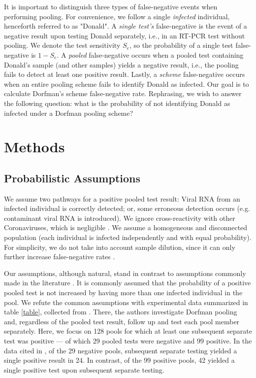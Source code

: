\documentclass{article}
\newcommand{\Se}{S_e}
\begin{document}
It is important to distinguish three types of false-negative events when performing pooling. For convenience, we follow a single \emph{infected} individual, henceforth referred to as "Donald". A \emph{single test's} false-negative is the event of a negative result upon testing Donald separately, i.e., in an RT-PCR test without pooling. We denote the test sensitivity $\Se$, so the probability of a single test false-negative is $1-\Se$. A \emph{pooled} false-negative occurs when a pooled test containing Donald's sample (and other samples) yields a negative result, i.e., the pooling fails to detect at least one positive result. Lastly, a \emph{scheme} false-negative occurs when an entire pooling scheme fails to identify Donald as infected. Our goal is to calculate Dorfman's scheme false-negative rate. Rephrasing, we wish to answer the following question: what is the probability of not identifying Donald as infected under a Dorfman pooling scheme? 




\section{Methods}
\subsection{Probabilistic Assumptions}\label{subsec:assumptions}
We assume two pathways for a positive pooled test result: Viral RNA from an infected individual is correctly detected; or, some erroneous detection occurs (e.g. contaminant viral RNA is introduced). We ignore cross-reactivity with other Coronaviruses, which is negligible \cite{KitComparison}. We assume a homogeneous and disconnected population (each individual is infected independently and with equal probability). For simplicity, we do not take into account sample dilution, since it can only further increase false-negative rates \cite{DorfmanYuvalDor}.

Our assumptions, although natural, stand in contrast to assumptions commonly made in the literature \cite{Kim, Simplistic1, Simplistic2, OptimalDorfmanPool}. It is commonly assumed that the probability of a positive pooled test is not increased by having more than one infected individual in the pool. We refute the common assumptions with experimental data summarized in table \ref{table}, collected from \cite{Salazar}. There, the authors investigate Dorfman pooling and, regardless of the pooled test result, follow up and test each pool member separately. Here, we focus on 128 pools for which at least one subsequent separate test was positive --- of which 29 pooled tests were negative and 99 positive. In the data cited in \cite{Salazar}, of the 29 negative pools, subsequent separate testing yielded a single positive result in 24. In contrast, of the 99 positive pools, 42 yielded a single positive test upon subsequent separate testing. 
\end{document}
